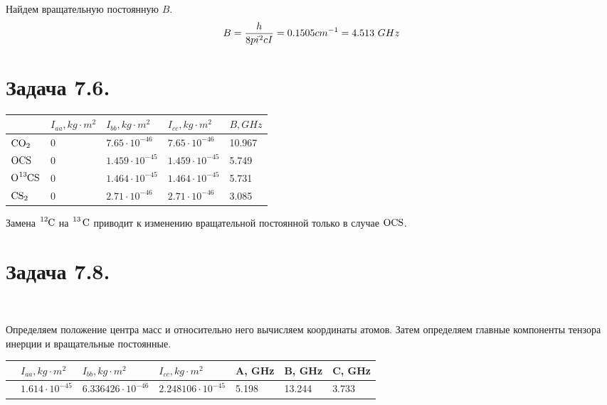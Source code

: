 \documentclass[14pt]{article}
\begin{document}
Найдем вращательную постоянную $B$.
\begin{gather}
B = \frac{h}{8 pi^2 c I} = 0.1505 cm^{-1} = 4.513 \ GHz \notag
\end{gather}

\section*{Задача 7.6.}
\renewcommand{\arraystretch}{1.6}
\begin{table}[H]
\begin{center}
\begin{tabular}{|P{1.5cm}|P{2cm}|P{2cm}|P{2cm}|P{2cm}|}
\hline
& $I_{aa}, kg \cdot m^2$ & $I_{bb}, kg \cdot m^2$ & $I_{cc}, kg \cdot m^2$ & $B, GHz$  \\ \hline
$\ce{CO2}$ & 0 & $7.65 \cdot 10^{-46}$ & $7.65 \cdot 10^{-46}$ & 10.967 \\ \hline
$\ce{OCS}$ & 0 & $1.459 \cdot 10^{-45}$ & $1.459 \cdot 10^{-45}$ & 5.749 \\ \hline
$\ce{O{}^{13}CS}$ & 0 & $1.464 \cdot 10^{-45}$ & $1.464 \cdot 10^{-45}$ & 5.731 \\ \hline
$\ce{CS2}$ & 0 & $2.71 \cdot 10^{-46}$ & $2.71 \cdot 10^{-46}$ & 3.085 \\ \hline
\end{tabular} 
\end{center}
\end{table}    

Замена $\ce{{}^12C}$ на $\ce{{}^13 C}$ приводит к изменению вращательной постоянной только в случае $\ce{OCS}$. 

\section*{Задача 7.8.}
\begin{center}
 \\ 
[\baselineskip]
\end{center}

Определяем положение центра масс и относительно него вычисляем координаты атомов. Затем определяем главные компоненты тензора инерции и вращательные постоянные.

\begin{table}[H]
\begin{center}
\begin{tabular}{|P{1.5cm}|P{3cm}|P{3cm}|P{3cm}|P{1.5cm}|P{1.5cm}|P{1.5cm}|}
\hline
 & $I_{aa}, kg \cdot m^2$ & $I_{bb}, kg \cdot m^2$ & $I_{cc}, kg \cdot m^2$ & A, GHz & B, GHz & C, GHz \\ \hline
  & $1.614 \cdot 10^{-45}$ & $6.336426 \cdot 10^{-46}$ & $2.248106 \cdot 10^{-45}$ & 5.198 & 13.244 & 3.733 \\ \hline
\end{tabular}
\end{center}
\end{table} 
\end{document}
